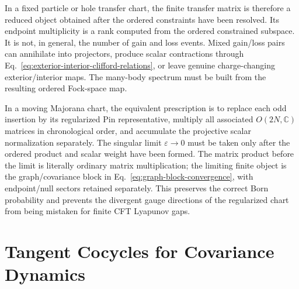 \documentclass[aps,prb,onecolumn,nofootinbib,superscriptaddress]{revtex4-2}
\theoremstyle{plain}
\theoremstyle{definition}
\begin{document}
In a fixed particle or hole transfer chart, the finite transfer matrix is
therefore a reduced object obtained after the ordered constraints have been
resolved.  Its endpoint multiplicity is a rank computed from the ordered
constrained subspace.  It is not, in general, the number of gain and loss
events.  Mixed gain/loss pairs can annihilate into projectors, produce scalar
contractions through Eq.~\eqref{eq:exterior-interior-clifford-relations}, or
leave genuine charge-changing exterior/interior maps.  The many-body spectrum
must be built from the resulting ordered Fock-space map.

In a moving Majorana chart, the equivalent prescription is to replace each odd
insertion by its regularized Pin representative, multiply all associated
\(O(2N,\mathbb C)\) matrices in chronological order, and accumulate the
projective scalar normalization separately.  The singular limit
\(\varepsilon\to0\) must be taken only after the ordered product and scalar
weight have been formed.  The matrix product before the limit is literally
ordinary matrix multiplication; the limiting finite object is the
graph/covariance block in Eq.~\eqref{eq:graph-block-convergence}, with
endpoint/null sectors retained separately.  This preserves the correct Born
probability and prevents the divergent gauge directions of the regularized
chart from being mistaken for finite CFT Lyapunov gaps.

\section{Tangent Cocycles for Covariance Dynamics}
\label{sec:tangent-cocycle}
\end{document}
